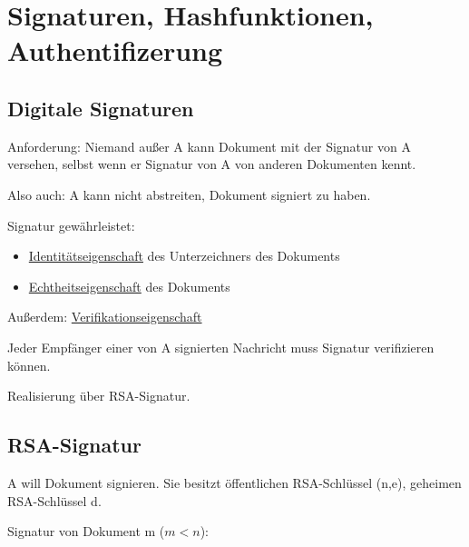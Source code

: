 \chapter{Signaturen, Hashfunktionen, Authentifizerung}

  \section{Digitale Signaturen}

  Anforderung: Niemand außer A kann Dokument mit der Signatur von A versehen, selbst wenn er Signatur von A von anderen Dokumenten kennt.

  \par \medskip

  Also auch: A kann nicht abstreiten, Dokument signiert zu haben.

  \par \medskip

  \par \medskip

  Signatur gewährleistet:

  \begin{itemize}
    \item \underline{Identitätseigenschaft} des Unterzeichners des Dokuments

    \item \underline{Echtheitseigenschaft} des Dokuments
  \end{itemize}

  Außerdem: \underline{Verifikationseigenschaft}

  \par \medskip

  Jeder Empfänger einer von A signierten Nachricht muss Signatur verifizieren können.

  \par \medskip

  \par \medskip

  Realisierung über RSA-Signatur.

  \section{RSA-Signatur}

  A will Dokument signieren. Sie besitzt öffentlichen RSA-Schlüssel (n,e), geheimen RSA-Schlüssel d.

  \par \medskip

  Signatur von Dokument m ($m < n$):

